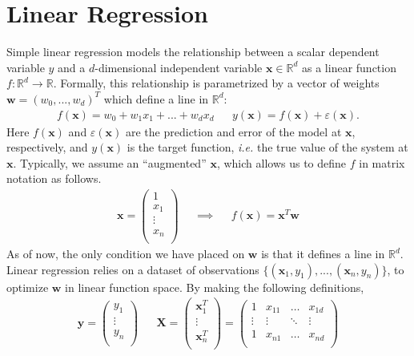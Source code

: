 \documentclass[11pt]{article}
\begin{document}
 

\section*{Linear Regression} 
Simple linear regression models the relationship between a scalar dependent
variable $y$ and a \mbox{$d$-dimensional} independent variable $\mathbf{x} \in
\mathbb{R}^d$ as a linear function $f: \mathbb{R}^d \rightarrow \mathbb{R}$.
Formally, this relationship is parametrized by a vector of weights
\mbox{$\mathbf{w} = (w_0, ... , w_d)^T$} which define a line in $\mathbb{R}^d$:
\begin{align}
	f(\mathbf{x}) 
= 
	w_0 + w_1 x_{1} + ...  + w_d x_{d} 
&& 
	y(\mathbf{x}) 
=
	f(\mathbf{x}) 
+ 
	\varepsilon(\mathbf{x}). 
\end{align} 
Here $f(\mathbf{x})$ and $\varepsilon(\mathbf{x})$ are the prediction and error
of the model at $\mathbf{x}$, respectively, and $y(\mathbf{x})$ is the target
function, \textit{i.e.} the true value of the system at $\mathbf{x}$.
Typically, we assume an ``augmented'' $\mathbf{x}$, which allows us to define
$f$ in matrix notation as follows.  
\begin{align} 
	\mathbf{x} 
= 
	\begin{pmatrix}
		1      \\ 
		x_1    \\
		\vdots \\ 
		x_n    \\ 
	\end{pmatrix} 
&& 
	\implies 
&& 
	f(\mathbf{x}) 
= 
	\mathbf{x}^T
	\mathbf{w} 
\end{align} 
As of now, the only condition we have placed on $\mathbf{w}$ is that it defines
a line in $\mathbb{R}^d$.  
Linear regression relies on a dataset of observations $\{(\mathbf{x}_1, y_1),
... , (\mathbf{x}_n, y_n)\}$, to optimize $\mathbf{w}$ in linear function
space.  
By making the following definitions,
\begin{align} 
	\mathbf{y} 
=
	\begin{pmatrix}
		y_1    \\ 
		\vdots \\ 
		y_n    \\ 
	\end{pmatrix} 
&& 
	\mathbf{X} 
= 
	\begin{pmatrix}
		\mathbf{x}_1^T \\ 
		\vdots   	   \\ 
		\mathbf{x}_n^T \\ 
	\end{pmatrix} 
=
	\begin{pmatrix} 
		1 	    &  x_{11}  & \hdots & x_{1d} \\ 
		\vdots  &  \vdots  & \ddots & \vdots \\ 
		1 		&  x_{n1}  & \hdots & x_{nd} \\ 
	\end{pmatrix} 
\end{align} 
\end{document}
